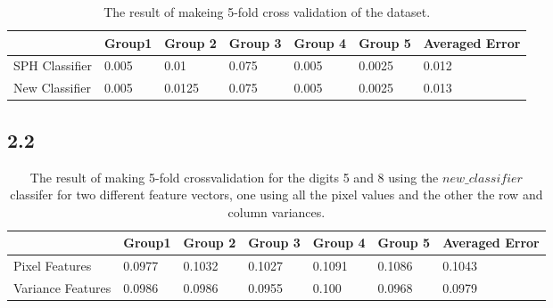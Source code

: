 \documentclass[table,xcdraw]{article}
\begin{document}
\begin{table}[H]
\centering
\caption{The result of makeing 5-fold cross validation of the dataset. }
\label{my-label}
\begin{tabular}{|l|l|l|l|l|l|l|}
\hline
               & Group1 & Group 2 & Group 3 & Group 4 & Group 5 & Averaged Error \\ \hline
SPH Classifier & 0.005  & 0.01    & 0.075   & 0.005   & 0.0025  & 0.012          \\ \hline
New Classifier & 0.005  & 0.0125  & 0.075   & 0.005   & 0.0025  & 0.013          \\ \hline
\end{tabular}
\end{table}

\subsection*{2.2}

\begin{table}[H]
\centering
\caption{The result of making 5-fold crossvalidation for the digits 5 and 8 using the \texttt{$new\_classifier$} classifer for two different feature vectors, one using all the pixel values and the other the row and column variances.}
\label{my-label}
\begin{tabular}{|l|l|l|l|l|l|l|}
\hline
                  & Group1 & Group 2 & Group 3 & Group 4 & Group 5 & Averaged Error \\ \hline
Pixel Features    & 0.0977 & 0.1032  & 0.1027  & 0.1091  & 0.1086  & 0.1043         \\ \hline
Variance Features & 0.0986 & 0.0986  & 0.0955  & 0.100   & 0.0968  & 0.0979         \\ \hline
\end{tabular}
\end{table}
\end{document}
